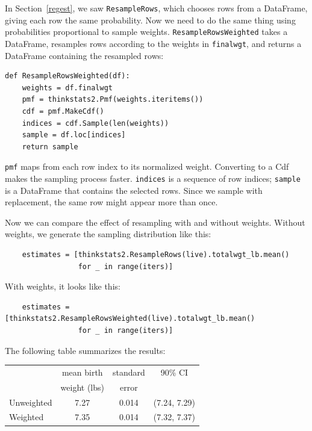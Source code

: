 \documentclass[12pt]{book}
\begin{document}
In Section~\ref{regest}, we saw {\tt ResampleRows}, which chooses
rows from a DataFrame, giving each row the same probability.
Now we need to do the same thing using probabilities
proportional to sample weights.
{\tt ResampleRowsWeighted} takes a DataFrame, resamples rows according
to the weights in {\tt finalwgt}, and returns a DataFrame containing
the resampled rows:

\begin{verbatim}
def ResampleRowsWeighted(df):
    weights = df.finalwgt
    pmf = thinkstats2.Pmf(weights.iteritems())
    cdf = pmf.MakeCdf()
    indices = cdf.Sample(len(weights))
    sample = df.loc[indices]
    return sample
\end{verbatim}

{\tt pmf} maps from each row index to its normalized weight.  Converting
to a Cdf makes the sampling process faster.  {\tt indices} is a sequence
of row indices; {\tt sample} is a DataFrame that contains the selected
rows.  Since we sample with replacement, the same row might appear
more than once.

Now we can compare the effect of resampling with and without
weights.  Without weights, we generate the sampling distribution
like this:

\begin{verbatim}
    estimates = [thinkstats2.ResampleRows(live).totalwgt_lb.mean()
                 for _ in range(iters)]
\end{verbatim}

With weights, it looks like this:

\begin{verbatim}
    estimates = [thinkstats2.ResampleRowsWeighted(live).totalwgt_lb.mean()
                 for _ in range(iters)]
\end{verbatim}

The following table summarizes the results:

\begin{center}
\begin{tabular}{|l|c|c|c|}
\hline
                    &  mean birth   & standard  &  90\% CI  \\ 
                    &  weight (lbs) & error     &           \\ 
\hline
Unweighted          &  7.27  &  0.014  &  (7.24, 7.29)  \\ 
Weighted            &  7.35  &  0.014  &  (7.32, 7.37)  \\ 
\hline
\end{tabular}
\end{center}
\end{document}
